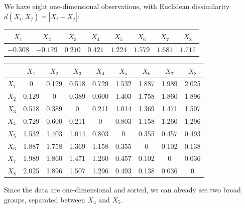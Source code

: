 \begin{example}[DIANA]
We have eight one-dimensional observations, with Euclidean dissimilarity $d(X_i, X_j) = |X_i - X_j|$:
\begin{center}
\begin{tabular}{@{}cccccccc@{}}
\toprule
$X_1$ & $X_2$ & $X_3$ & $X_4$ & $X_5$ & $X_6$ & $X_7$ & $X_8$ \\
\midrule
$-0.308$ & $-0.179$ & $0.210$ & $0.421$ & $1.224$ & $1.579$ & $1.681$ & $1.717$ \\
\bottomrule
\end{tabular}

\medskip
{\small
\begin{tabular}{@{}c|cccccccc@{}}
 & $X_1$ & $X_2$ & $X_3$ & $X_4$ & $X_5$ & $X_6$ & $X_7$ & $X_8$ \\
\midrule
$X_1$ & 0 & 0.129 & 0.518 & 0.729 & 1.532 & 1.887 & 1.989 & 2.025 \\
$X_2$ & 0.129 & 0 & 0.389 & 0.600 & 1.403 & 1.758 & 1.860 & 1.896 \\
$X_3$ & 0.518 & 0.389 & 0 & 0.211 & 1.014 & 1.369 & 1.471 & 1.507 \\
$X_4$ & 0.729 & 0.600 & 0.211 & 0 & 0.803 & 1.158 & 1.260 & 1.296 \\
$X_5$ & 1.532 & 1.403 & 1.014 & 0.803 & 0 & 0.355 & 0.457 & 0.493 \\
$X_6$ & 1.887 & 1.758 & 1.369 & 1.158 & 0.355 & 0 & 0.102 & 0.138 \\
$X_7$ & 1.989 & 1.860 & 1.471 & 1.260 & 0.457 & 0.102 & 0 & 0.036 \\
$X_8$ & 2.025 & 1.896 & 1.507 & 1.296 & 0.493 & 0.138 & 0.036 & 0 \\
\end{tabular}}
\end{center}
Since the data are one-dimensional and sorted, we can already see two broad groups, separated between $X_4$ and $X_5$.


\end{example}
